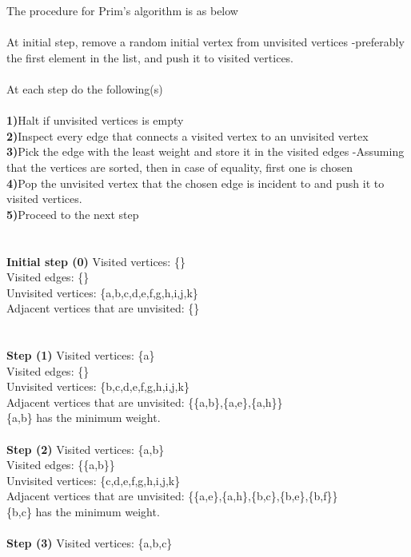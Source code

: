 \documentclass[11pt]{article}
\begin{document}
The procedure for Prim's algorithm is as below
\\ \\
At initial step, remove a random initial vertex from unvisited vertices -preferably the first 
element in the list, and push it to visited vertices.
\\ \\
At each step do the following(s)
\\ \\
\textbf{1)}Halt if unvisited vertices is empty\\
\textbf{2)}Inspect every edge that connects a visited vertex to an unvisited vertex \\
\textbf{3)}Pick the edge with the least weight and store it in the visited edges 
-Assuming that the vertices are sorted, then in case of equality, first one is chosen\\
\textbf{4)}Pop the unvisited vertex that the chosen edge is incident to and push it to 
visited vertices.\\
\textbf{5)}Proceed to the next step\\
\\ \\
\textbf{Initial step (0)} 
Visited vertices: \{\}\\
Visited edges: \{\}\\
Unvisited vertices: \{a,b,c,d,e,f,g,h,i,j,k\}\\
Adjacent vertices that are unvisited: \{\}\\
\\ \\
\textbf{Step (1)} 
Visited vertices: \{a\}\\
Visited edges: \{\}\\
Unvisited vertices: \{b,c,d,e,f,g,h,i,j,k\}\\
Adjacent vertices that are unvisited: \{\{a,b\},\{a,e\},\{a,h\}\}\\
\{a,b\} has the minimum weight.
\\ \\
\textbf{Step (2)} 
Visited vertices: \{a,b\}\\
Visited edges: \{\{a,b\}\}\\
Unvisited vertices: \{c,d,e,f,g,h,i,j,k\}\\
Adjacent vertices that are unvisited: \{\{a,e\},\{a,h\},\{b,c\},\{b,e\},\{b,f\}\}\\
\{b,c\} has the minimum weight.
\\ \\
\textbf{Step (3)} 
Visited vertices: \{a,b,c\}\\
\end{document}

